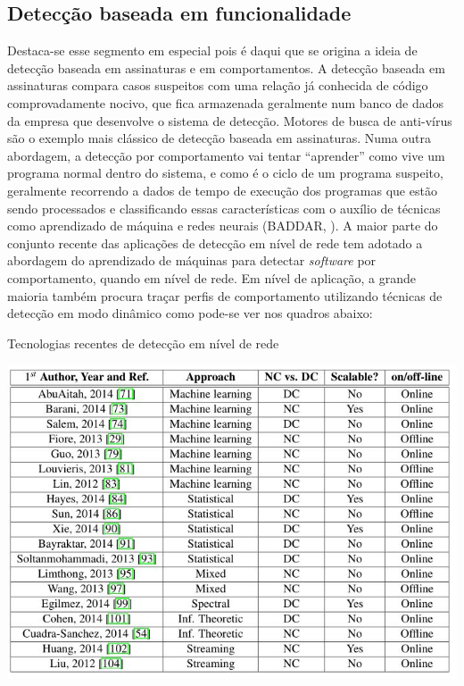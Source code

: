 \subsection{Detecção baseada em funcionalidade}
\label{ss.deteccao_funcionalidade} Destaca-se esse segmento em especial pois é
daqui que se origina a ideia de detecção baseada em assinaturas e em
comportamentos. A detecção baseada em assinaturas compara casos suspeitos com
uma relação já conhecida de código comprovadamente nocivo, que fica armazenada
geralmente num banco de dados da empresa que desenvolve o sistema de detecção.
Motores de busca de anti-vírus são o exemplo mais clássico de detecção baseada
em assinaturas. Numa outra abordagem, a detecção por comportamento vai tentar
``aprender'' como vive um programa normal dentro do sistema, e como é o ciclo
de um programa suspeito, geralmente recorrendo a dados de tempo de execução
dos programas que estão sendo processados e classificando essas
características com o auxílio de técnicas como aprendizado de máquina e redes
neurais (BADDAR, \citeyear{baddarxx}). A maior parte do conjunto recente das aplicações de detecção
em nível de rede tem adotado a abordagem do aprendizado de máquinas para
detectar \textit{software} por comportamento, quando em nível de rede. Em nível de
aplicação, a grande maioria também procura traçar perfis de comportamento
utilizando técnicas de detecção em modo dinâmico como pode-se ver nos quadros
abaixo:

\begin{quadro}[h]
\caption{\small Tecnologias recentes de detecção em nível de rede}
\centering
\includegraphics[scale=0.7]{figs/tabela_deteccao_nivel_rede.JPG}
\label{f.tabeladeteccao_rede}
\end{quadro}

